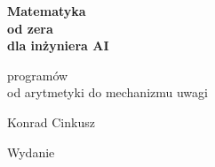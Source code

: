 \thispagestyle{empty}
\begin{center}
\vspace*{3.0cm}

{\Huge\bfseries\color{mblue} Matematyka\\[6pt] od zera\\[6pt] dla inżyniera AI}

\vspace{1.0cm}
{\Large\color{mgrey}  programów \dash{}\\[4pt]
od arytmetyki do mechanizmu uwagi}

\vspace{2.4cm}
{\large Konrad Cinkusz}

\vfill
{\small\color{mgrey} Wydanie \bookedition}

\vspace{1.2cm}
\end{center}
\clearpage

